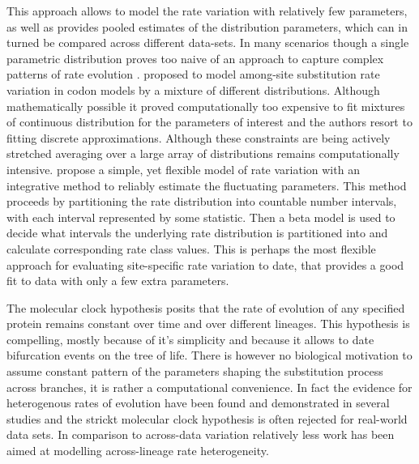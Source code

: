 This approach allows to model the rate variation with relatively few parameters, as well as provides pooled estimates of the distribution parameters, which can in turned be compared across different data-sets.  
In many scenarios though a single parametric distribution proves too naive of an approach to capture complex patterns of rate evolution \citep{Pond2005a}.
\cite{Yang2000} proposed to model among-site substitution rate variation in codon models by a mixture of different distributions.
Although mathematically possible it proved computationally too expensive to fit mixtures of continuous distribution for the parameters of interest and the authors resort to fitting discrete approximations.
Although these constraints are being actively stretched \citep{Suchard2009,Ayres2012} averaging over a large array of distributions remains computationally intensive. 
\citet{Pond2005a} propose a simple, yet flexible model of rate variation with an integrative method to reliably estimate the fluctuating parameters.
This method proceeds by partitioning the rate distribution into countable number intervals, with each interval represented by some statistic.
Then a beta model is used to decide what intervals the underlying rate distribution is partitioned into and calculate corresponding rate class values.
This is perhaps the most flexible approach for evaluating site-specific rate variation to date, that provides a good fit to data with only a few extra parameters.

The molecular clock hypothesis \citep{Zuckerkandl1962} posits that the rate of evolution of any specified protein remains constant over time and over different lineages.
This hypothesis is compelling, mostly because of it's simplicity and because it allows to date bifurcation events on the tree of life.
There is however no biological motivation to assume constant pattern of the parameters shaping the substitution process across branches, it is rather a computational convenience.
In fact the evidence for heterogenous rates of evolution have been found and demonstrated in several studies \citep{EyreWalker1997,Andreasen2001} and the strickt molecular clock hypothesis is often rejected for real-world data sets.
In comparison to across-data variation relatively less work has been aimed at modelling across-lineage rate heterogeneity.

